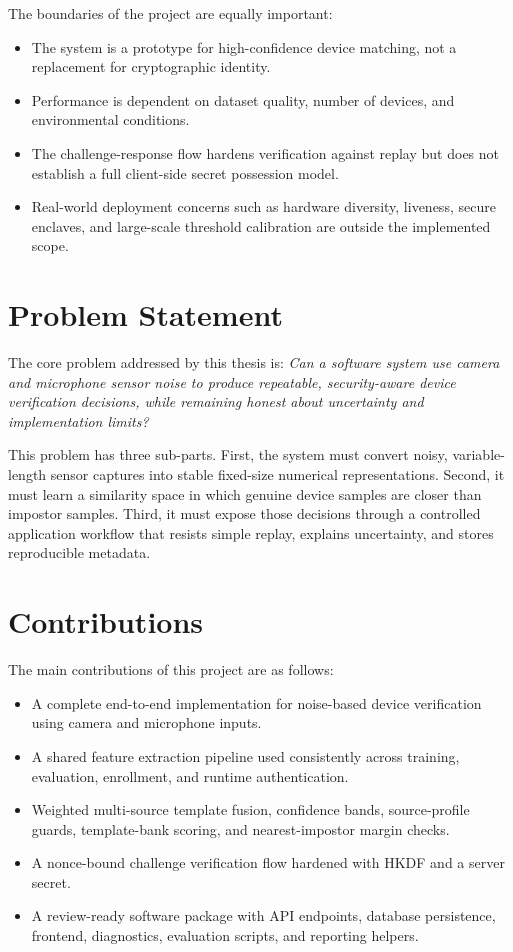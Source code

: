 \documentclass[12pt]{report}
\begin{document}
The boundaries of the project are equally important:
\begin{itemize}[leftmargin=1.2cm]
\item The system is a prototype for high-confidence device matching, not a replacement for cryptographic identity.
\item Performance is dependent on dataset quality, number of devices, and environmental conditions.
\item The challenge-response flow hardens verification against replay but does not establish a full client-side secret possession model.
\item Real-world deployment concerns such as hardware diversity, liveness, secure enclaves, and large-scale threshold calibration are outside the implemented scope.
\end{itemize}

\section{Problem Statement}
The core problem addressed by this thesis is: \emph{Can a software system use camera and microphone sensor noise to produce repeatable, security-aware device verification decisions, while remaining honest about uncertainty and implementation limits?}

This problem has three sub-parts. First, the system must convert noisy, variable-length sensor captures into stable fixed-size numerical representations. Second, it must learn a similarity space in which genuine device samples are closer than impostor samples. Third, it must expose those decisions through a controlled application workflow that resists simple replay, explains uncertainty, and stores reproducible metadata.

\section{Contributions}
The main contributions of this project are as follows:
\begin{itemize}[leftmargin=1.2cm]
\item A complete end-to-end implementation for noise-based device verification using camera and microphone inputs.
\item A shared feature extraction pipeline used consistently across training, evaluation, enrollment, and runtime authentication.
\item Weighted multi-source template fusion, confidence bands, source-profile guards, template-bank scoring, and nearest-impostor margin checks.
\item A nonce-bound challenge verification flow hardened with HKDF and a server secret.
\item A review-ready software package with API endpoints, database persistence, frontend, diagnostics, evaluation scripts, and reporting helpers.
\end{itemize}
\end{document}

